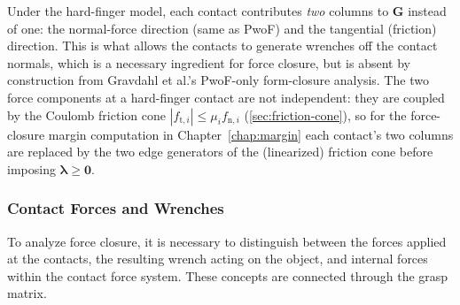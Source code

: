 Under the hard-finger model, each contact contributes \emph{two} columns to
$\boldsymbol{G}$ instead of one: the normal-force direction (same as PwoF)
and the tangential (friction) direction. This is what allows the contacts to
generate wrenches off the contact normals, which is a necessary ingredient
for force closure, but is absent by construction from
Gravdahl et al.'s PwoF-only form-closure analysis. The two force
components at a hard-finger contact are not independent: they are coupled by
the Coulomb friction cone $|f_{\mathrm{t},i}| \le \mu_i f_{\mathrm{n},i}$
(\cref{sec:friction-cone}), so
for the force-closure margin computation in
Chapter~\ref{chap:margin} each contact's two columns are replaced by the two
edge generators of the (linearized) friction cone before imposing
$\boldsymbol{\lambda} \ge \boldsymbol{0}$.

\subsubsection{Contact Forces and Wrenches}
\label{sec:contact-forces-wrenches}

To analyze force closure, it is necessary to distinguish between the forces
applied at the contacts, the resulting wrench acting on the object, and
internal forces within the contact force system. These concepts are
connected through the grasp matrix.

